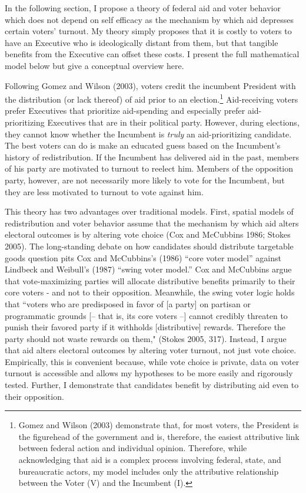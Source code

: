 \documentclass[12pt]{paper}
\begin{document}
In the following section, I propose a theory of federal aid and voter behavior which does not depend on self efficacy as the mechanism by which aid depresses certain voters' turnout. My theory simply proposes that it is costly to voters to have an Executive who is ideologically distant from them, but that tangible benefits from the Executive can offset these costs. I present the full mathematical model below but give a conceptual overview here. 

Following Gomez and Wilson (2003), voters credit the incumbent President with the distribution (or lack thereof) of aid prior to an election.\footnote{Gomez and Wilson (2003) demonstrate that, for most voters, the President is the figurehead of the government and is, therefore, the easiest attributive link between federal action and individual opinion. Therefore, while acknowledging that aid is a complex process involving federal, state, and bureaucratic actors, my model includes only the attributive relationship between the Voter (V) and the Incumbent (I).} Aid-receiving voters prefer Executives that prioritize aid-spending and especially prefer aid-prioritizing Executives that are in their political party. However, during elections, they cannot know whether the Incumbent is \textit{truly} an aid-prioritizing candidate. The best voters can do is make an educated guess based on the Incumbent's history of redistribution. If the Incumbent has delivered aid in the past, members of his party are motivated to turnout to reelect him. Members of the opposition party, however, are not necessarily more likely to vote for the Incumbent, but they are less motivated to turnout to vote against him.

This theory has two  advantages over traditional models. First, spatial models of redistribution and voter behavior assume that the mechanism by which aid alters electoral outcomes is by altering vote choice (Cox and McCubbins 1986; Stokes 2005). The long-standing debate on how candidates should distribute targetable goods question pits Cox and McCubbins's (1986) ``core voter model” against Lindbeck and Weibull's (1987) ``swing voter model.” Cox and McCubbins argue that vote-maximizing parties will allocate distributive benefits primarily to their core voters - and not to their opposition. Meanwhile, the swing voter logic holds that ``voters who are predisposed in favor of [a party] on partisan or programmatic grounds [– that is, its core voters –] cannot credibly threaten to punish their favored party if it withholds [distributive] rewards. Therefore the party should not waste rewards on them," (Stokes 2005, 317). Instead, I argue that aid alters electoral outcomes by altering voter turnout, not just vote choice. Empirically, this is convenient because, while vote choice is private, data on voter turnout is  accessible and allows my hypotheses to be more easily and rigorously tested. Further, I demonstrate that candidates benefit by distributing aid even to their opposition.
\end{document}
